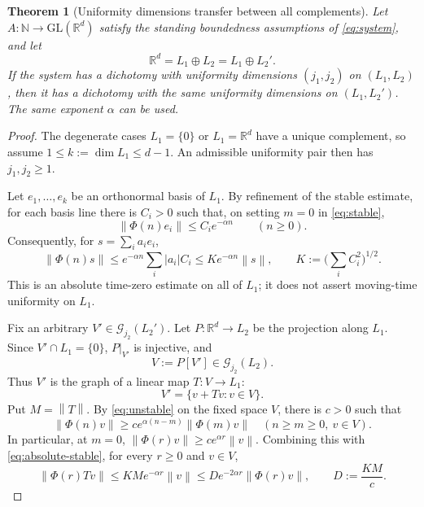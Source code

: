 \documentclass[11pt]{article}
\newtheorem{theorem}{Theorem}
\theoremstyle{definition}
\newcommand{\R}{\mathbb R}
\newcommand{\N}{\mathbb N}
\newcommand{\G}{\mathcal G}
\newcommand{\Phiop}{\Phi}
\newcommand{\norm}[1]{\left\lVert #1\right\rVert}
\begin{document}
\begin{theorem}[Uniformity dimensions transfer between all complements]
\label{thm:transfer}
Let $A\colon\N\to\mathrm{GL}(\R^d)$ satisfy the standing boundedness
assumptions of \eqref{eq:system}, and let
\[
 \R^d=L_1\oplus L_2=L_1\oplus L_2'.
\]
If the system has a dichotomy with uniformity dimensions $(j_1,j_2)$ on
$(L_1,L_2)$, then it has a dichotomy with the same uniformity dimensions on
$(L_1,L_2')$.  The same exponent $\alpha$ can be used.
\end{theorem}

\begin{proof}
The degenerate cases $L_1=\{0\}$ or $L_1=\R^d$ have a unique complement, so
assume $1\le k:=\dim L_1\le d-1$.  An admissible uniformity pair then has
$j_1,j_2\ge1$.

Let $e_1,\dots,e_k$ be an orthonormal basis of $L_1$.  By refinement of the
stable estimate, for each basis line there is $C_i>0$ such that, on setting
$m=0$ in \eqref{eq:stable},
\[
 \norm{\Phiop(n)e_i}\le C_i e^{-\alpha n}\qquad(n\ge0).
\]
Consequently, for $s=\sum_i a_i e_i$,
\begin{equation}\label{eq:absolute-stable}
 \norm{\Phiop(n)s}
 \le e^{-\alpha n}\sum_i |a_i|C_i
 \le K e^{-\alpha n}\norm{s},
 \qquad K:=\Big(\sum_i C_i^2\Big)^{1/2}.
\end{equation}
This is an absolute time-zero estimate on all of $L_1$; it does not assert
moving-time uniformity on $L_1$.

Fix an arbitrary $V'\in\G_{j_2}(L_2')$.  Let $P\colon\R^d\to L_2$ be the
projection along $L_1$.  Since $V'\cap L_1=\{0\}$, $P|_{V'}$ is injective,
and
\[
 V:=P[V']\in\G_{j_2}(L_2).
\]
Thus $V'$ is the graph of a linear map $T\colon V\to L_1$:
\[
 V'=\{v+Tv:v\in V\}.
\]
Put $M=\norm T$.  By \eqref{eq:unstable} on the fixed space $V$, there is
$c>0$ such that
\begin{equation}\label{eq:Vunstable}
 \norm{\Phiop(n)v}\ge c e^{\alpha(n-m)}\norm{\Phiop(m)v}
 \quad(n\ge m\ge0,\ v\in V).
\end{equation}
In particular, at $m=0$,
$\norm{\Phiop(r)v}\ge c e^{\alpha r}\norm v$.  Combining this with
\eqref{eq:absolute-stable}, for every $r\ge0$ and $v\in V$,
\begin{equation}\label{eq:ratio}
 \norm{\Phiop(r)Tv}
 \le KM e^{-\alpha r}\norm v
 \le D e^{-2\alpha r}\norm{\Phiop(r)v},
 \qquad D:=\frac{KM}{c}.
\end{equation}


\end{proof}
\end{document}
